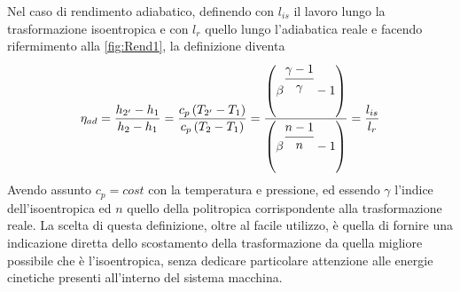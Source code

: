 Nel caso di rendimento adiabatico, definendo con $l_{is}$ il lavoro lungo la trasformazione isoentropica e con $l_r$ quello lungo l'adiabatica reale e facendo rifermimento alla \ref{fig:Rend1}, la definizione diventa
\begin{align*}
\eta_{ad} = \frac{h_{2'} - h_1}{h_2 - h_1} = \frac{c_p \left( T_{2'} - T_1 \right)}{c_p \left( T_2 - T_1 \right)} = \frac{\left( \beta^{\cfrac{\gamma -1}{\gamma}} -1 \right)}{\left( \beta^{\cfrac{n -1}{n}} -1 \right)} = \frac{l_{is}}{l_r}
\end{align*}
Avendo assunto $c_p = cost$ con la temperatura e pressione, ed essendo $\gamma$ l'indice dell'isoentropica ed $n$ quello della politropica corrispondente alla trasformazione reale. La scelta di questa definizione, oltre al facile utilizzo, è quella di fornire una indicazione diretta dello scostamento della trasformazione da quella migliore possibile che è l'isoentropica, senza dedicare particolare attenzione alle energie cinetiche presenti all'interno del sistema macchina.
